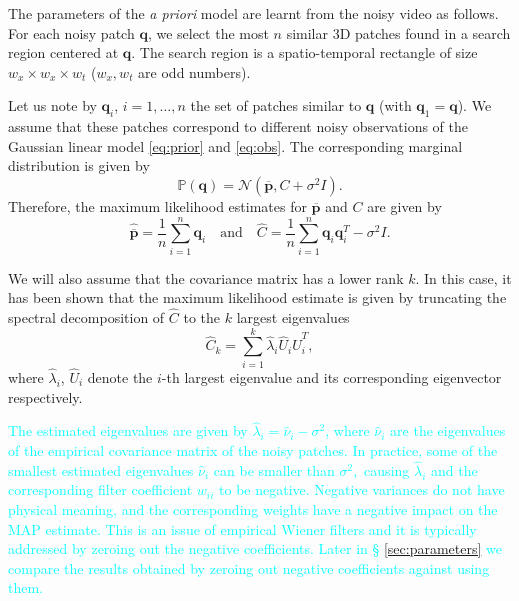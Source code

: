 \documentclass[10pt, journal, twocolumn, final, a4paper]{IEEEtran}
\newcommand{\pa}[1]{\textcolor{cyan}{#1}}
\newcommand{\padd}[1]{\pa{#1}}
\newcommand{\ma}[1]{\boldsymbol{#1}}
\begin{document}
The parameters of the \textit{a priori} model are learnt from the noisy video as
follows. For each noisy patch $\ma q$, we select the most $n$
similar 3D patches found in a search region centered at $\ma q$. The
search region is a spatio-temporal rectangle of size $w_x \times
w_x \times w_t$ ($w_x, w_t$ are odd numbers). 

Let us note by $\ma q_i$, $i = 1, \dots, n$ the set of patches
similar to $\ma q$ (with $\ma q_1 = \ma q$). We assume that these 
patches correspond to different noisy observations of the Gaussian linear model
\eqref{eq:prior} and \eqref{eq:obs}. The corresponding marginal distribution is given by
\[\mathds P(\ma q) = \mathcal N(\overline{\ma p}, C + \sigma^2I). \]
Therefore, the maximum likelihood estimates for $\overline{\ma p}$ and $C$ are given by 
\begin{equation}
	\widehat{\overline{\ma p}} = \frac1{n}\sum_{i = 1}^{n}\ma q_i \quad\text{and}\quad 
		\widehat C= \frac1n\sum_{i = 1}^{n}\ma q_i\ma q_i^T - \sigma^2I.
	\label{eq:learn_parameters}
\end{equation}

We will also assume that the covariance matrix has a lower rank $k$.  In this
case, it has been shown \cite{Tipping1999} that the maximum likelihood estimate is given by
truncating the spectral decomposition of $\widehat C$ to the $k$ largest
eigenvalues 
\begin{equation}
\widehat C_k = \sum_{i = 1}^k\widehat \lambda_i\widehat U_i\widehat U_i^T,
\end{equation}
where $\widehat \lambda_i$, $\widehat U_i$ denote the $i$-th largest
eigenvalue and its corresponding eigenvector respectively.

\padd{The estimated eigenvalues are given by $\widehat \lambda_i = \widehat
\nu_i - \sigma^2$, where $\widehat \nu_i$ are the eigenvalues of the empirical
covariance matrix of the noisy patches. In practice, some of the smallest
estimated eigenvalues $\widehat \nu_i$ can be smaller than $\sigma^2,$ causing
$\widehat \lambda_i$ and the corresponding filter coefficient $w_{ii}$ to be
negative. Negative variances do not have physical meaning, and the
corresponding weights have a negative impact on the MAP estimate. This is an
issue of empirical Wiener filters and it is typically addressed by zeroing out
the negative coefficients. Later in \S
\ref{sec:parameters} we compare the results obtained by zeroing out negative
coefficients against using them.}
\end{document}

